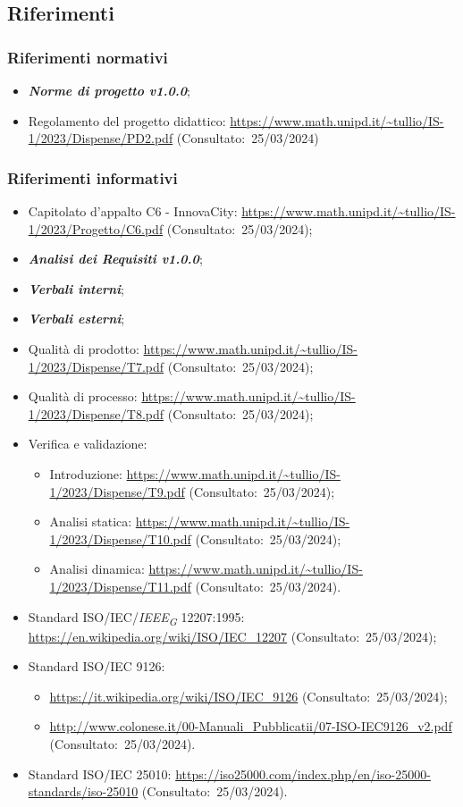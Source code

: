 \subsection{Riferimenti}
\subsubsection{Riferimenti normativi}
\begin{itemize}
    \item \textbf{\textit{Norme di progetto v1.0.0}};
    \item Regolamento del progetto didattico: \url{https://www.math.unipd.it/~tullio/IS-1/2023/Dispense/PD2.pdf} (Consultato:~25/03/2024)
\end{itemize}
\subsubsection{Riferimenti informativi}
\begin{itemize}
    \item Capitolato d’appalto C6 - InnovaCity: \url{https://www.math.unipd.it/~tullio/IS-1/2023/Progetto/C6.pdf} (Consultato:~25/03/2024);
    \item \textbf{\textit{Analisi dei Requisiti v1.0.0}};
    \item \textbf{\textit{Verbali interni}};
    \item \textbf{\textit{Verbali esterni}};
    \item Qualità di prodotto: \url{https://www.math.unipd.it/~tullio/IS-1/2023/Dispense/T7.pdf} (Consultato:~25/03/2024);
    \item Qualità di processo: \url{https://www.math.unipd.it/~tullio/IS-1/2023/Dispense/T8.pdf} (Consultato:~25/03/2024);
    \item Verifica e validazione: \begin{itemize}
    \item Introduzione: \url{https://www.math.unipd.it/~tullio/IS-1/2023/Dispense/T9.pdf} (Consultato:~25/03/2024);
    \item Analisi statica: \url{https://www.math.unipd.it/~tullio/IS-1/2023/Dispense/T10.pdf} (Consultato:~25/03/2024);
    \item Analisi dinamica: \url{https://www.math.unipd.it/~tullio/IS-1/2023/Dispense/T11.pdf} (Consultato:~25/03/2024).
    \end{itemize}
    \item Standard ISO/IEC/\textit{IEEE}\textsubscript{\textit{G}} 12207:1995: \url{https://en.wikipedia.org/wiki/ISO/IEC_12207} (Consultato:~25/03/2024);
    \item Standard ISO/IEC 9126: \begin{itemize}
        \item \url{https://it.wikipedia.org/wiki/ISO/IEC_9126} (Consultato:~25/03/2024);
        \item \url{http://www.colonese.it/00-Manuali_Pubblicatii/07-ISO-IEC9126_v2.pdf} (Consultato:~25/03/2024).
    \end{itemize}
    \item Standard ISO/IEC 25010: \url{https://iso25000.com/index.php/en/iso-25000-standards/iso-25010} (Consultato:~25/03/2024).
\end{itemize}
